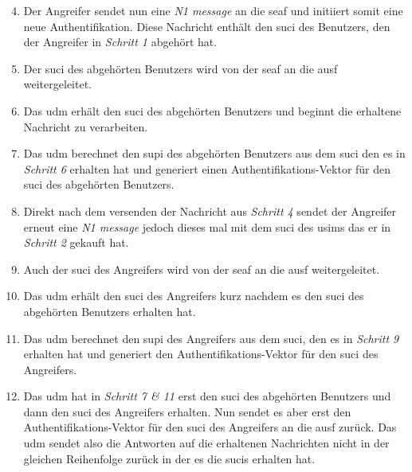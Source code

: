 \begin{enumerate}
\setcounter{enumi}{3}

\item Der Angreifer sendet nun eine \textit{N1 message} an die \gls{seaf} und initiiert somit eine neue Authentifikation.
Diese Nachricht enthält den \gls{suci} des Benutzers, den der Angreifer in \textit{Schritt 1} abgehört hat.

\item Der \gls{suci} des abgehörten Benutzers wird von der \gls{seaf} an die \gls{ausf} weitergeleitet.

\item Das \gls{udm} erhält den \gls{suci} des abgehörten Benutzers und beginnt die erhaltene Nachricht zu verarbeiten.

\item Das \gls{udm} berechnet den \gls{supi} des abgehörten Benutzers aus dem \gls{suci} den es in \textit{Schritt 6} erhalten hat und generiert einen Authentifikations-Vektor für den \gls{suci} des abgehörten Benutzers.

\item Direkt nach dem versenden der Nachricht aus \textit{Schritt 4} sendet der Angreifer erneut eine \textit{N1 message} jedoch dieses mal mit dem \gls{suci} des \gls{usim}s das er in \textit{Schritt 2} gekauft hat.

\item Auch der \gls{suci} des Angreifers wird von der \gls{seaf} an die \gls{ausf} weitergeleitet.

\item Das \gls{udm} erhält den \gls{suci} des Angreifers kurz nachdem es den \gls{suci} des abgehörten Benutzers erhalten hat.

\item Das \gls{udm} berechnet den \gls{supi} des Angreifers aus dem \gls{suci}, den es in \textit{Schritt 9} erhalten hat und generiert den Authentifikations-Vektor  für den \gls{suci} des Angreifers.

\item Das \gls{udm} hat in \textit{Schritt 7 \& 11} erst den \gls{suci} des abgehörten Benutzers und dann den \gls{suci} des Angreifers erhalten.
Nun sendet es aber erst den Authentifikations-Vektor für den \gls{suci} des Angreifers an die \gls{ausf} zurück.
Das \gls{udm} sendet also die Antworten auf die erhaltenen Nachrichten nicht in der gleichen Reihenfolge zurück in der es die \gls{suci}s erhalten hat.


\end{enumerate}
